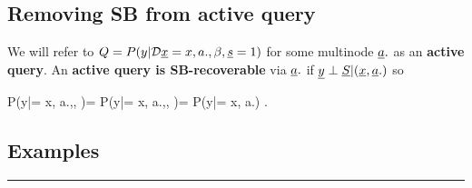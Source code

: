 \subsection{Removing SB from
active query}

We will refer to $Q=P(y|\cald \rvx=x, a., \beta, \rvs=1)$ 
for some multinode $\rva.$
as an {\bf  active query}.
An {\bf active query is
SB-recoverable}
via $\rva.$ if $\rvy\perp\rvS|(\rvx, \rva.)$ so

\beq
P(y|\cald \rvx = x, a.,\beta, )=
P(y|\cald \rvx = x, a.,\beta, )=
P(y|\cald \rvx = x, a.)
\;.
\eeq
                                      
\subsection{Examples}
\hrule
